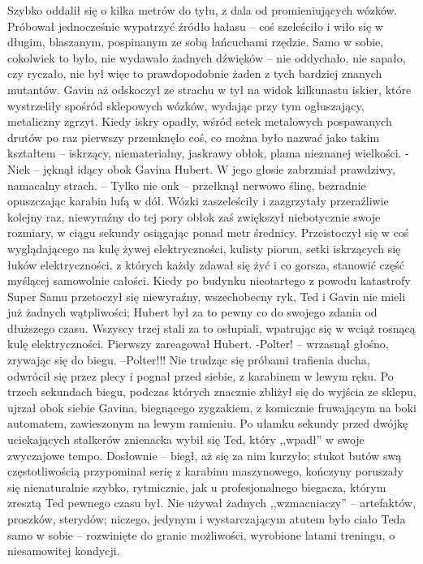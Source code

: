 \documentclass[../MAIN.tex]{subfiles}
\begin{document}
Szybko oddalił się o kilka metrów do tyłu, z dala od promieniujących wózków. Próbował jednocześnie wypatrzyć źródło hałasu -- coś szeleściło i wiło się w długim, blaszanym, pospinanym ze sobą łańcuchami rzędzie. Samo w sobie, cokolwiek to było, nie wydawało żadnych dźwięków -- nie oddychało, nie sapało, czy ryczało, nie był więc to prawdopodobnie żaden z tych bardziej znanych mutantów.
Gavin aż odskoczył ze strachu w tył na widok kilkunastu iskier, które wystrzeliły spośród sklepowych wózków, wydając przy tym ogłuszający, metaliczny zgrzyt. Kiedy iskry opadły, wśród setek metalowych pospawanych drutów po raz pierwszy przemknęło coś, co można było nazwać jako takim kształtem -- iskrzący, niematerialny, jaskrawy obłok, plama nieznanej wielkości.
-Nie\3k -- jęknął idący obok Gavina Hubert. W jego głosie zabrzmiał prawdziwy, namacalny strach. -- Tylko nie on\3k -- przełknął nerwowo ślinę, bezradnie opuszczając karabin lufą w dół.
Wózki zaszeleściły i zazgrzytały przeraźliwie kolejny raz, niewyraźny do tej pory obłok zaś zwiększył niebotycznie swoje rozmiary, w ciągu sekundy osiągając ponad metr średnicy. Przeistoczył się w coś wyglądającego na kulę żywej elektryczności, kulisty piorun, setki iskrzących się łuków elektryczności, z których każdy zdawał się żyć i co gorsza, stanowić część myślącej samowolnie całości.
Kiedy po budynku nieotartego z powodu katastrofy Super Samu przetoczył się niewyraźny, wszechobecny ryk, Ted i Gavin nie mieli już żadnych wątpliwości; Hubert był za to pewny co do swojego zdania od dłuższego czasu. Wszyscy trzej stali za to osłupiali, wpatrując się w wciąż rosnącą kulę elektryczności. Pierwszy zareagował Hubert.
-Polter! -- wrzasnął głośno, zrywając się do biegu. –Polter!!!
Nie trudząc się próbami trafienia ducha, odwrócił się przez plecy i pognał przed siebie, z karabinem w lewym ręku. Po trzech sekundach biegu, podczas których znacznie zbliżył się do wyjścia ze sklepu, ujrzał obok siebie Gavina, biegnącego zygzakiem, z komicznie fruwającym na boki automatem, zawieszonym na lewym ramieniu. Po ułamku sekundy przed dwójkę uciekających stalkerów znienacka wybił się Ted, który ,,wpadł'' w swoje zwyczajowe tempo. Dosłownie -- biegł, aż się za nim kurzyło; stukot butów swą częstotliwością przypominał serię z karabinu maszynowego, kończyny poruszały się nienaturalnie szybko, rytmicznie, jak u profesjonalnego biegacza, którym zresztą Ted pewnego czasu był.
Nie używał żadnych ,,wzmacniaczy'' -- artefaktów, proszków, sterydów; niczego, jedynym i wystarczającym atutem było ciało Teda samo w sobie -- rozwinięte do granic możliwości, wyrobione latami treningu, o niesamowitej kondycji.
\end{document}

